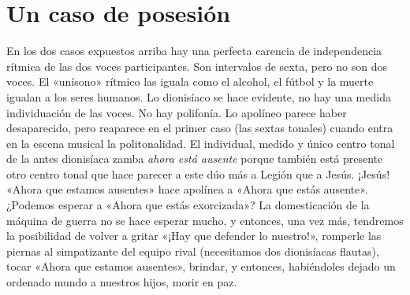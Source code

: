 \section{Un caso de posesión}
En los dos casos expuestos arriba hay una perfecta carencia de independencia rítmica de las dos voces participantes. Son intervalos de sexta, pero no son dos voces. El «unísono» rítmico las iguala como el alcohol, el fútbol y la muerte igualan a los seres humanos. Lo dionisíaco se hace evidente, no hay una medida individuación de las voces. No hay polifonía. Lo apolíneo parece haber desaparecido, pero reaparece en el primer caso (las sextas tonales) cuando entra en la escena musical la politonalidad. El individual, medido y único centro tonal de la antes dionisíaca zamba \emph{ahora está ausente} porque también está presente otro centro tonal que hace parecer a este dúo más a Legión que a Jesús. ¡Jesús! «Ahora que estamos ausentes» hace apolínea a «Ahora que estás ausente». ¿Podemos esperar a «Ahora que estás exorcizada»? La domesticación de la máquina de guerra no se hace esperar mucho, y entonces, una vez más, tendremos la posibilidad de volver a gritar «¡Hay que defender lo nuestro!», romperle las piernas al simpatizante del equipo rival (necesitamos dos dionisíacas flautas), tocar «Ahora que estamos ausentes», brindar, y entonces, habiéndoles dejado un ordenado mundo a nuestros hijos, morir en paz.
